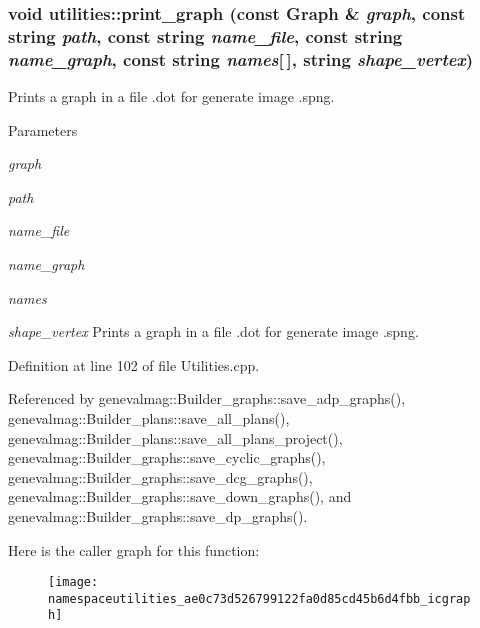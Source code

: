 \hypertarget{namespaceutilities_ae0c73d526799122fa0d85cd45b6d4fbb}{
\subsubsection[{print\_\-graph}]{\setlength{\rightskip}{0pt plus 5cm}void utilities::print\_\-graph (const Graph \& {\em graph}, \/  const string {\em path}, \/  const string {\em name\_\-file}, \/  const string {\em name\_\-graph}, \/  const string {\em names}\mbox{[}$\,$\mbox{]}, \/  string {\em shape\_\-vertex})}}
\label{namespaceutilities_ae0c73d526799122fa0d85cd45b6d4fbb}
Prints a graph in a file .dot for generate image .spng. 
\begin{DoxyParams}{Parameters}
\item[{\em graph}]\item[{\em path}]\item[{\em name\_\-file}]\item[{\em name\_\-graph}]\item[{\em names}]\item[{\em shape\_\-vertex}]Prints a graph in a file .dot for generate image .spng. \end{DoxyParams}


Definition at line 102 of file Utilities.cpp.



Referenced by genevalmag::Builder\_\-graphs::save\_\-adp\_\-graphs(), genevalmag::Builder\_\-plans::save\_\-all\_\-plans(), genevalmag::Builder\_\-plans::save\_\-all\_\-plans\_\-project(), genevalmag::Builder\_\-graphs::save\_\-cyclic\_\-graphs(), genevalmag::Builder\_\-graphs::save\_\-dcg\_\-graphs(), genevalmag::Builder\_\-graphs::save\_\-down\_\-graphs(), and genevalmag::Builder\_\-graphs::save\_\-dp\_\-graphs().



Here is the caller graph for this function:\nopagebreak
\begin{figure}[H]
\begin{center}
\leavevmode
\texttt{[image: namespaceutilities\_ae0c73d526799122fa0d85cd45b6d4fbb\_icgraph]}
\end{center}
\end{figure}


